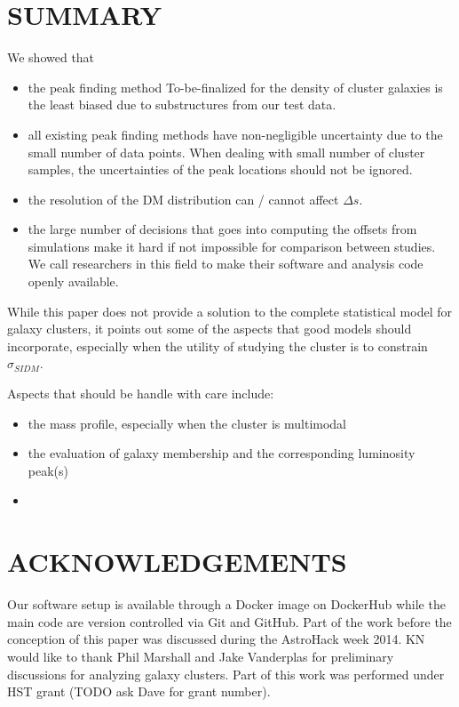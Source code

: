\section{SUMMARY}
We showed that 
\begin{itemize}
		\item  the peak finding method To-be-finalized for the density of cluster
			galaxies is the least biased due to substructures from our test data. 
		\item  all existing peak finding methods have non-negligible uncertainty 
			due to the small number of data points. When dealing with small number of
			cluster samples, the uncertainties of the peak locations should not be
			ignored.
		\item the resolution of the DM distribution can / cannot affect
			$\Delta s$.   
		\item the large number of decisions that goes into computing the offsets
			from simulations make it hard if not impossible for comparison between studies. 
			We call researchers in this field to make their software and analysis code openly
			available.
\end{itemize}
While this paper does not provide a solution to the complete statistical model
for galaxy clusters, it points out some of the aspects that good models should
incorporate, especially when the utility of studying the cluster is to
constrain $\sigma_{SIDM}$.

Aspects that should be handle with care include:
\begin{itemize}
		\item the mass profile, especially when the cluster is multimodal 
		\item the evaluation of galaxy membership and the corresponding luminosity
			peak(s)
		\item 
	\end{itemize}



\section{ACKNOWLEDGEMENTS}
Our software setup is available through a Docker image on DockerHub while the
main code are version controlled via Git and GitHub. 
Part of the work before the conception of this paper was discussed during 
the AstroHack week 2014. KN would like to thank Phil
Marshall and Jake Vanderplas for preliminary discussions for analyzing galaxy clusters. 
Part of this work was performed under HST grant (TODO ask Dave for grant
number). 



